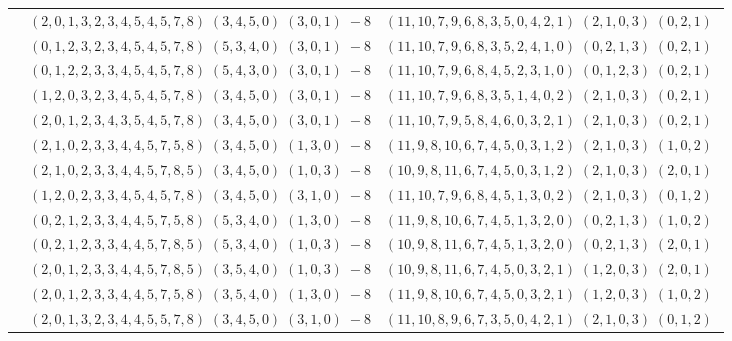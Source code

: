 \documentclass[11pt]{article}
\begin{document}
\begin{longtable}[l]{|c|c|c|}
 \cline{2-3} 
 & $(2 ,0 ,1 ,3 ,2 ,3 ,4 ,5 ,4 ,5 ,7 ,8) \;(3 ,4 ,5 ,0) \;(3 ,0 ,1) \;-8$ & $(11 ,10 ,7 ,9 ,6 ,8 ,3 ,5 ,0 ,4 ,2 ,1) \;(2 ,1 ,0 ,3) \;(0 ,2 ,1) \;$\\ 
 \cline{2-3} 
 & $(0 ,1 ,2 ,3 ,2 ,3 ,4 ,5 ,4 ,5 ,7 ,8) \;(5 ,3 ,4 ,0) \;(3 ,0 ,1) \;-8$ & $(11 ,10 ,7 ,9 ,6 ,8 ,3 ,5 ,2 ,4 ,1 ,0) \;(0 ,2 ,1 ,3) \;(0 ,2 ,1) \;$\\ 
 \cline{2-3} 
 & $(0 ,1 ,2 ,2 ,3 ,3 ,4 ,5 ,4 ,5 ,7 ,8) \;(5 ,4 ,3 ,0) \;(3 ,0 ,1) \;-8$ & $(11 ,10 ,7 ,9 ,6 ,8 ,4 ,5 ,2 ,3 ,1 ,0) \;(0 ,1 ,2 ,3) \;(0 ,2 ,1) \;$\\ 
 \cline{2-3} 
 & $(1 ,2 ,0 ,3 ,2 ,3 ,4 ,5 ,4 ,5 ,7 ,8) \;(3 ,4 ,5 ,0) \;(3 ,0 ,1) \;-8$ & $(11 ,10 ,7 ,9 ,6 ,8 ,3 ,5 ,1 ,4 ,0 ,2) \;(2 ,1 ,0 ,3) \;(0 ,2 ,1) \;$\\ 
 \cline{2-3} 
 & $(2 ,0 ,1 ,2 ,3 ,4 ,3 ,5 ,4 ,5 ,7 ,8) \;(3 ,4 ,5 ,0) \;(3 ,0 ,1) \;-8$ & $(11 ,10 ,7 ,9 ,5 ,8 ,4 ,6 ,0 ,3 ,2 ,1) \;(2 ,1 ,0 ,3) \;(0 ,2 ,1) \;$\\ 
 \cline{2-3} 
 & $(2 ,1 ,0 ,2 ,3 ,3 ,4 ,4 ,5 ,7 ,5 ,8) \;(3 ,4 ,5 ,0) \;(1 ,3 ,0) \;-8$ & $(11 ,9 ,8 ,10 ,6 ,7 ,4 ,5 ,0 ,3 ,1 ,2) \;(2 ,1 ,0 ,3) \;(1 ,0 ,2) \;$\\ 
 \cline{2-3} 
 & $(2 ,1 ,0 ,2 ,3 ,3 ,4 ,4 ,5 ,7 ,8 ,5) \;(3 ,4 ,5 ,0) \;(1 ,0 ,3) \;-8$ & $(10 ,9 ,8 ,11 ,6 ,7 ,4 ,5 ,0 ,3 ,1 ,2) \;(2 ,1 ,0 ,3) \;(2 ,0 ,1) \;$\\ 
 \cline{2-3} 
 & $(1 ,2 ,0 ,2 ,3 ,3 ,4 ,5 ,4 ,5 ,7 ,8) \;(3 ,4 ,5 ,0) \;(3 ,1 ,0) \;-8$ & $(11 ,10 ,7 ,9 ,6 ,8 ,4 ,5 ,1 ,3 ,0 ,2) \;(2 ,1 ,0 ,3) \;(0 ,1 ,2) \;$\\ 
 \cline{2-3} 
 & $(0 ,2 ,1 ,2 ,3 ,3 ,4 ,4 ,5 ,7 ,5 ,8) \;(5 ,3 ,4 ,0) \;(1 ,3 ,0) \;-8$ & $(11 ,9 ,8 ,10 ,6 ,7 ,4 ,5 ,1 ,3 ,2 ,0) \;(0 ,2 ,1 ,3) \;(1 ,0 ,2) \;$\\ 
 \cline{2-3} 
 & $(0 ,2 ,1 ,2 ,3 ,3 ,4 ,4 ,5 ,7 ,8 ,5) \;(5 ,3 ,4 ,0) \;(1 ,0 ,3) \;-8$ & $(10 ,9 ,8 ,11 ,6 ,7 ,4 ,5 ,1 ,3 ,2 ,0) \;(0 ,2 ,1 ,3) \;(2 ,0 ,1) \;$\\ 
 \cline{2-3} 
 & $(2 ,0 ,1 ,2 ,3 ,3 ,4 ,4 ,5 ,7 ,8 ,5) \;(3 ,5 ,4 ,0) \;(1 ,0 ,3) \;-8$ & $(10 ,9 ,8 ,11 ,6 ,7 ,4 ,5 ,0 ,3 ,2 ,1) \;(1 ,2 ,0 ,3) \;(2 ,0 ,1) \;$\\ 
 \cline{2-3} 
 & $(2 ,0 ,1 ,2 ,3 ,3 ,4 ,4 ,5 ,7 ,5 ,8) \;(3 ,5 ,4 ,0) \;(1 ,3 ,0) \;-8$ & $(11 ,9 ,8 ,10 ,6 ,7 ,4 ,5 ,0 ,3 ,2 ,1) \;(1 ,2 ,0 ,3) \;(1 ,0 ,2) \;$\\ 
 \cline{2-3} 
 & $(2 ,0 ,1 ,3 ,2 ,3 ,4 ,4 ,5 ,5 ,7 ,8) \;(3 ,4 ,5 ,0) \;(3 ,1 ,0) \;-8$ & $(11 ,10 ,8 ,9 ,6 ,7 ,3 ,5 ,0 ,4 ,2 ,1) \;(2 ,1 ,0 ,3) \;(0 ,1 ,2) \;$\\ 

\end{longtable}
\end{document}

